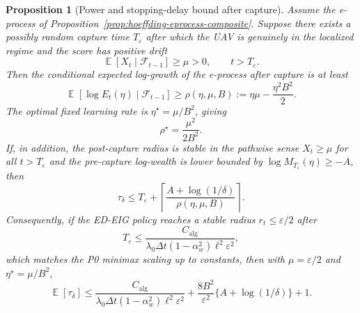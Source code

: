 \documentclass[11pt]{article}
\newtheorem{proposition}[theorem]{Proposition}
\DeclareMathOperator{\E}{\mathbb{E}}
\newcommand{\dt}{\Delta t}
\begin{document}
\begin{proposition}[Power and stopping-delay bound after capture]\label{prop:eprocess-power-stopping}
Assume the e-process of Proposition~\ref{prop:hoeffding-eprocess-composite}.  Suppose there exists a possibly random capture time $T_{\varepsilon}$ after which the UAV is genuinely in the localized regime and the score has positive drift
\begin{equation}
        \E[X_t\mid\mathcal{F}_{t-1}]
        \geq
        \mu
        >
        0,
        \qquad
        t>T_{\varepsilon}.
        \label{eq:alternative-positive-drift}
\end{equation}
Then the conditional expected log-growth of the e-process after capture is at least
\begin{equation}
        \E[\log E_t(\eta)\mid\mathcal{F}_{t-1}]
        \geq
        \rho(\eta,\mu,B)
        :=
        \eta\mu-\frac{\eta^2B^2}{2}.
        \label{eq:log-growth-rate}
\end{equation}
The optimal fixed learning rate is $\eta^\star=\mu/B^2$, giving
\[
        \rho^\star=\frac{\mu^2}{2B^2}.
\]
If, in addition, the post-capture radius is stable in the pathwise sense $X_t\geq\mu$ for all $t>T_{\varepsilon}$ and the pre-capture log-wealth is lower bounded by $\log M_{T_{\varepsilon}}(\eta)\geq-A$, then
\begin{equation}
        \tau_\delta
        \leq
        T_{\varepsilon}
        +
        \left\lceil
        \frac{A+\log(1/\delta)}
             {\rho(\eta,\mu,B)}
        \right\rceil .
        \label{eq:pathwise-stopping-delay}
\end{equation}
Consequently, if the ED-EIG policy reaches a stable radius $r_t\leq\varepsilon/2$ after
\begin{equation}
        T_{\varepsilon}
        \leq
        \frac{C_{\mathrm{alg}}}
        {\lambda_0\dt(1-\alpha_w^2)\ell^2\varepsilon^2},
        \label{eq:algorithmic-capture-time}
\end{equation}
which matches the P0 minimax scaling up to constants, then with $\mu=\varepsilon/2$ and $\eta^\star=\mu/B^2$,
\begin{equation}
        \E[\tau_\delta]
        \leq
        \frac{C_{\mathrm{alg}}}
        {\lambda_0\dt(1-\alpha_w^2)\ell^2\varepsilon^2}
        +
        \frac{8B^2}{\varepsilon^2}
        \{A+\log(1/\delta)\}
        +
        1 .
        \label{eq:expected-stopping-upper-bound}
\end{equation}
\end{proposition}
\end{document}
